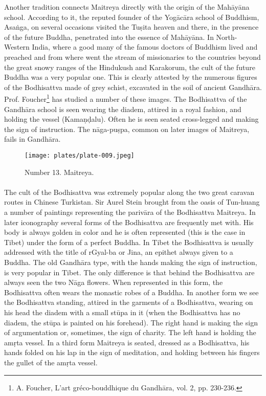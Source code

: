 \documentclass[a4paper, 12pt, oneside]{article}
\begin{document}
Another tradition connects Maitreya directly with the origin of the Mah\={a}y\={a}na school. According to it, the reputed founder of the Yog\={a}c\={a}ra school of Buddhism, Asa\.{n}ga, on several occasions visited the Tu\d{s}ita heaven and there, in the presence of the future Buddha, penetrated into the essence of Mah\={a}y\={a}na. In North-Western India, where a good many of the famous doctors of Buddhism lived and preached and from where went the stream of missionaries to the countries beyond the great snowy ranges of the Hindukush and Karakorum, the cult of the future Buddha was a very popular one. This is clearly attested by the numerous figures of the Bodhisattva made of grey schist, excavated in the soil of ancient Gandh\={a}ra. Prof. Foucher\footnote{A. Foucher, L'art gréco-bouddhique du Gandh\={a}ra, vol. 2, pp. 230-236.} has studied a number of these images. The Bodhisattva of the Gandh\={a}ra school is seen wearing the diadem, attired in a royal fashion, and holding the vessel (Kama\d{n}\d{d}alu). Often he is seen seated cross-legged and making the sign of instruction. The n\={a}ga-pu\d{s}pa, common on later images of Maitreya, fails in Gandh\={a}ra.

\clearpage
\begin{figure}[H]
\centering
\texttt{[image: plates/plate-009.jpeg]}
\caption*{Number 13. Maitreya.}
\end{figure}
\clearpage
\paragraph{}
The cult of the Bodhisattva was extremely popular along the two great caravan routes in Chinese Turkistan. Sir Aurel Stein brought from the oasis of Tun-huang a number of paintings representing the pariv\={a}ra of the Bodhisattva Maitreya. In later iconography several forms of the Bodhisattva are frequently met with. His body is always golden in color and he is often represented (this is the case in Tibet) under the form of a perfect Buddha. In Tibet the Bodhisattva is usually addressed with the title of rGyal-ba or Jina, an epithet always given to a Buddha. The old Gandh\={a}ra type, with the hands making the sign of instruction, is very popular in Tibet. The only difference is that behind the Bodhisattva are always seen the two N\={a}ga flowers. When represented in this form, the Bodhisattva often wears the monastic robes of a Buddha. In another form we see the Bodhisattva standing, attired in the garments of a Bodhisattva, wearing on his head the diadem with a small st\={u}pa in it (when the Bodhisattva has no diadem, the st\={u}pa is painted on his forehead). The right hand is making the sign of argumentation or, sometimes, the sign of charity. The left hand is holding the am\d{r}ta vessel. In a third form Maitreya is seated, dressed as a Bodhisattva, his hands folded on his lap in the sign of meditation, and holding between his fingers the gullet of the am\d{r}ta vessel.
\end{document}

